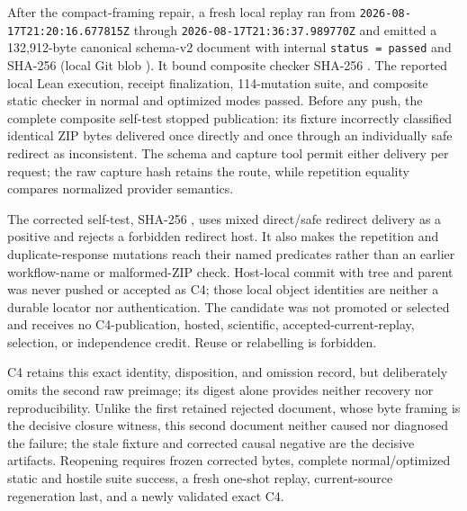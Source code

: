 \documentclass[11pt,a4paper]{article}
\begin{document}
After the compact-framing repair, a fresh local replay ran from
\texttt{2026-08-17T21:20:16.677815Z} through \texttt{2026-08-17T21:36:37.989770Z} and emitted a
132,912-byte canonical schema-v2 document with internal \texttt{status = passed} and SHA-256
 (local Git blob
). It bound composite checker SHA-256
. The reported local Lean
execution, receipt finalization, 114-mutation suite, and composite static checker in normal and
optimized modes passed. Before any push, the complete composite self-test stopped publication:
its  fixture incorrectly
classified identical ZIP bytes delivered once directly and once through an individually safe
redirect as inconsistent. The schema and capture tool permit either delivery per request; the raw
capture hash retains the route, while repetition equality compares normalized provider semantics.

The corrected self-test, SHA-256
, uses mixed direct/safe
redirect delivery as a positive and rejects a forbidden redirect host. It also makes the
repetition and duplicate-response mutations reach their named predicates rather than an earlier
workflow-name or malformed-ZIP check. Host-local commit
 with tree
 and parent
 was never pushed or accepted as C4; those local
object identities are neither a durable locator nor authentication. The candidate was not
promoted or selected and receives no C4-publication, hosted, scientific, accepted-current-replay,
selection, or independence credit. Reuse or relabelling is forbidden.

C4 retains this exact identity, disposition, and omission record, but deliberately omits the
second raw preimage; its
digest alone provides neither recovery nor reproducibility. Unlike the first retained rejected
document, whose byte framing is the decisive closure witness, this second document neither caused
nor diagnosed the failure; the stale fixture and corrected causal negative are the decisive
artifacts. Reopening requires frozen corrected bytes, complete normal/optimized static and hostile
suite success, a fresh one-shot replay, current-source regeneration last, and a newly validated
exact C4.
\end{document}
